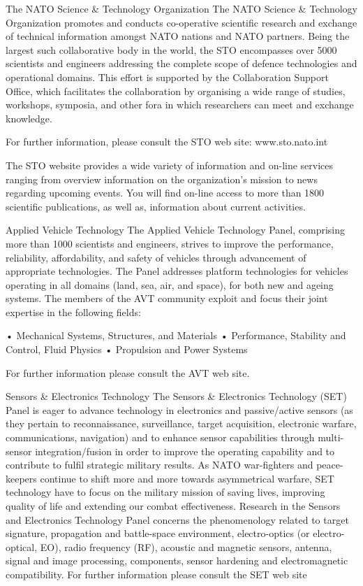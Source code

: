 The NATO Science & Technology Organization
The NATO Science & Technology Organization promotes and conducts co-operative scientific research and exchange of technical information amongst NATO nations and NATO partners. Being the largest such collaborative body in the world, the STO encompasses over 5000 scientists and engineers addressing the complete scope of defence technologies and operational domains. This effort is supported by the Collaboration Support Office, which facilitates the collaboration by organising a wide range of studies, workshops, symposia, and other fora in which researchers can meet and exchange knowledge. 

For further information, please consult the STO web site: www.sto.nato.int

The STO website provides a wide variety of information and on-line services ranging from overview information on the organization’s mission to news regarding upcoming events. You will find on-line access to more than 1800 scientific publications, as well as, information about current activities. 


Applied Vehicle Technology
The Applied Vehicle Technology Panel, comprising more than 1000 scientists and engineers, strives to improve the performance, reliability, affordability, and safety of vehicles through advancement of appropriate technologies. The Panel addresses platform technologies for vehicles operating in all domains (land, sea, air, and space), for both new and ageing systems.
The members of the AVT community exploit and focus their joint expertise in the following fields: 

•	Mechanical Systems, Structures, and Materials
•	Performance, Stability and Control, Fluid Physics 
•	Propulsion and Power Systems 


For further information please consult the AVT web site.



Sensors & Electronics Technology
The Sensors & Electronics Technology (SET) Panel is eager to advance technology in electronics and passive/active sensors (as they pertain to reconnaissance, surveillance, target acquisition, electronic warfare, communications, navigation) and to enhance sensor capabilities through multi-sensor integration/fusion in order to improve the operating capability and to contribute to fulfil strategic military results. As NATO war-fighters and peace-keepers continue to shift more and more towards asymmetrical warfare, SET technology have to focus on the military mission of saving lives, improving quality of life and extending our combat effectiveness. Research in the Sensors and Electronics Technology Panel concerns the phenomenology related to target signature, propagation and battle-space environment, electro-optics (or electro-optical, EO), radio frequency (RF), acoustic and magnetic sensors, antenna, signal and image processing, components, sensor hardening and electromagnetic compatibility.
For further information please consult the SET web site

